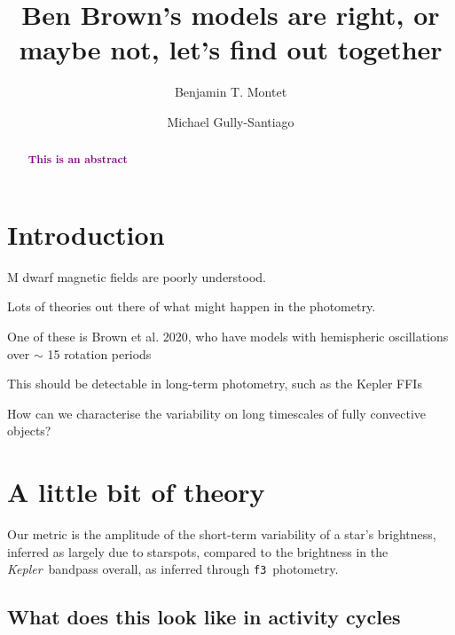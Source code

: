\documentclass[twocolumn,dvipsnames]{aastex631}
\newcommand{\kepler}{\textit{Kepler}\xspace}
\newcommand{\fthree}{\texttt{f3}}
\newcommand{\todo}[1]{\textbf{\textcolor{purple}{#1}}}
\begin{document}
\title{Ben Brown's models are right, or maybe not, let's find out together}



\author[0000-0001-7516-8308]{Benjamin T. Montet}


\author{Michael Gully-Santiago}


\begin{abstract}
\todo{This is an abstract}

\end{abstract}



\section{Introduction} \label{sec:intro}

M dwarf magnetic fields are poorly understood. 

Lots of theories out there of what might happen in the photometry.

One of these is Brown et al. 2020, who have models with hemispheric oscillations over $\sim$ 15 rotation periods

This should be detectable in long-term photometry, such as the Kepler FFIs

How can we characterise the variability on long timescales of fully convective objects?

\section{A little bit of theory}

Our metric is the amplitude of the short-term variability of a star's brightness, inferred as largely due to starspots, compared to the brightness in the \kepler\ bandpass overall, as inferred through \fthree\ photometry.

\subsection{What does this look like in activity cycles}
\end{document}
